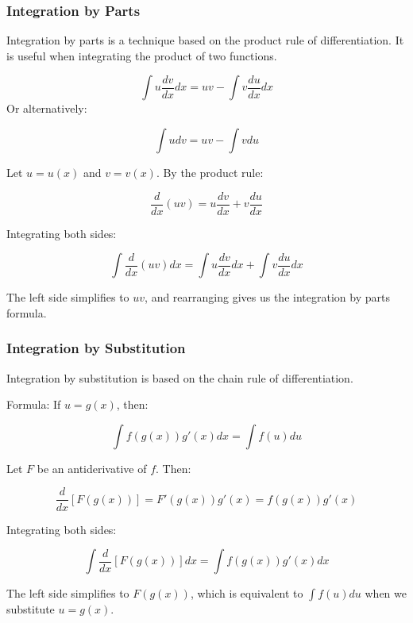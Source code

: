 \subsubsection{Integration by Parts}

\begin{definition}
Integration by parts is a technique based on the product rule of differentiation. It is useful when integrating the product of two functions.


$$
\int u \frac{dv}{dx} dx = uv - \int v \frac{du}{dx} dx
$$
Or alternatively:

$$\int u d v=u v-\int v d u$$

\end{definition}

\begin{theorem}
Let $u = u(x)$ and $v = v(x)$. By the product rule:

$$
\frac{d}{dx}(uv) = u\frac{dv}{dx} + v\frac{du}{dx}
$$

Integrating both sides:

$$
\int \frac{d}{dx}(uv) dx = \int u\frac{dv}{dx} dx + \int v\frac{du}{dx} dx
$$

The left side simplifies to $uv$, and rearranging gives us the integration by parts formula.
\end{theorem}

\subsubsection{Integration by Substitution}

\begin{definition}
Integration by substitution is based on the chain rule of differentiation.

Formula:
If $u = g(x)$, then:

$$
\int f(g(x))g'(x)dx = \int f(u)du
$$
\end{definition}

\begin{theorem}
Let $F$ be an antiderivative of $f$. Then:

$$
\frac{d}{dx}[F(g(x))] = F'(g(x))g'(x) = f(g(x))g'(x)
$$

Integrating both sides:

$$
\int \frac{d}{dx}[F(g(x))] dx = \int f(g(x))g'(x)dx
$$

The left side simplifies to $F(g(x))$, which is equivalent to $\int f(u)du$ when we substitute $u = g(x)$.
\end{theorem}


